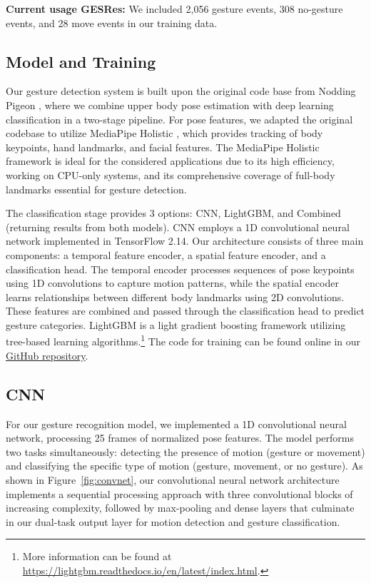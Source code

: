 \documentclass[11pt,smallheadings,cleardoublepage=empty,tocflat,numbers=noenddot,twoside,captions=tableheading]{scrbook}
\begin{document}
\begin{refsection}
\textbf{Current usage GESRes:} We included 2,056 gesture events, 308 no-gesture events, and 28 move events in our training data.

\subsection{Model and Training}
Our gesture detection system is built upon the original code base from Nodding Pigeon \parencite{yungNoddingPigeonHttps2022}, where we combine upper body pose estimation with deep learning classification in a two-stage pipeline. For pose features, we adapted the original codebase to utilize MediaPipe Holistic \parencite{lugaresiMediaPipeFrameworkBuilding2019}, which provides tracking of body keypoints, hand landmarks, and facial features. The MediaPipe Holistic framework is ideal for the considered applications due to its high efficiency, working on CPU-only systems, and its comprehensive coverage of full-body landmarks essential for gesture detection.

The classification stage provides 3 options: CNN, LightGBM, and Combined (returning results from both models). CNN employs a 1D convolutional neural network implemented in TensorFlow 2.14. Our architecture consists of three main components: a temporal feature encoder, a spatial feature encoder, and a classification head. The temporal encoder processes sequences of pose keypoints using 1D convolutions to capture motion patterns, while the spatial encoder learns relationships between different body landmarks using 2D convolutions. These features are combined and passed through the classification head to predict gesture categories. {\color{red} LightGBM is a light gradient boosting framework utilizing tree-based learning algorithms.}\footnote{\color{red} More information can be found at \url{https://lightgbm.readthedocs.io/en/latest/index.html}.} The code for training can be found online in our \href{https://github.com/WimPouw/envisionhgdetector/blob/main/training/Trainingcode/training_only_terminal_with_statistics_fullrun_largebatchaugmentationv11.py}{GitHub repository}.

\subsection{CNN}
For our gesture recognition model, we implemented a 1D convolutional neural network, processing 25 frames of normalized pose features. The model performs two tasks simultaneously: detecting the presence of motion (gesture or movement) and classifying the specific type of motion (gesture, movement, or no gesture). As shown in Figure~\ref{fig:convnet}, our convolutional neural network architecture implements a sequential processing approach with three convolutional blocks of increasing complexity, followed by max-pooling and dense layers that culminate in our dual-task output layer for motion detection and gesture classification.


\end{refsection}
\end{document}
